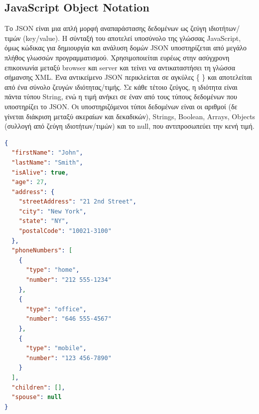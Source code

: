 \clearpage

\subsection{JavaScript Object Notation}

Το JSON είναι μια απλή μορφή αναπαράστασης δεδομένων ως ζεύγη ιδιοτήτων/τιμών (key/value). Η σύνταξή του αποτελεί υποσύνολο της γλώσσας JavaScript, όμως κώδικας για δημιουργία και ανάλυση δομών JSON υποστηρίζεται από μεγάλο πλήθος γλωσσών προγραμματισμού. Χρησιμοποιείται ευρέως στην ασύγχρονη επικοινωνία μεταξύ browser και server και τείνει να αντικαταστήσει τη γλώσσα σήμανσης XML. Ένα αντικείμενο JSON περικλείεται σε αγκύλες \{ \} και αποτελείται από ένα σύνολο ζευγών ιδιότητας/τιμής. Σε κάθε τέτοιο ζεύγος, η ιδιότητα είναι πάντα τύπου String, ενώ η τιμή ανήκει σε έναν από τους τύπους δεδομένων που υποστηρίζει το JSON. Οι υποστηριζόμενοι τύποι δεδομένων είναι οι αριθμοί (δε γίνεται διάκριση μεταξύ ακεραίων και δεκαδικών), Strings, Boolean, Arrays, Objects (συλλογή από ζεύγη ιδιοτήτων/τιμών) και το null, που αντιπροσωπεύει την κενή τιμή.

\begin{lstlisting}[language=JSON, caption=\selectlanguage{greek}Αναπαράσταση δεδομένων σε μορφή \selectlanguage{english}JSON\selectlanguage{greek}]
{
  "firstName": "John",
  "lastName": "Smith",
  "isAlive": true,
  "age": 27,
  "address": {
    "streetAddress": "21 2nd Street",
    "city": "New York",
    "state": "NY",
    "postalCode": "10021-3100"
  },
  "phoneNumbers": [
    {
      "type": "home",
      "number": "212 555-1234"
    },
    {
      "type": "office",
      "number": "646 555-4567"
    },
    {
      "type": "mobile",
      "number": "123 456-7890"
    }
  ],
  "children": [],
  "spouse": null
}
\end{lstlisting}

